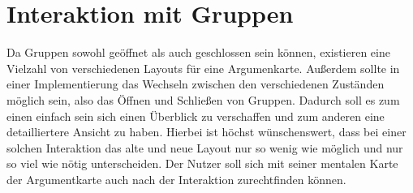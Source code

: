 
\section{Interaktion mit Gruppen}
Da Gruppen sowohl geöffnet als auch geschlossen sein können, existieren eine Vielzahl von verschiedenen Layouts für eine Argumenkarte.
Außerdem sollte in einer Implementierung das Wechseln zwischen den verschiedenen Zuständen möglich sein, also das Öffnen und Schließen von Gruppen. 
Dadurch soll es zum einen einfach sein sich einen Überblick zu verschaffen und zum anderen eine detailliertere Ansicht zu haben.
Hierbei ist höchst wünschenswert, dass bei einer solchen Interaktion das alte und neue Layout nur so wenig wie möglich und nur so viel wie nötig unterscheiden. 
Der Nutzer soll sich mit seiner mentalen Karte der Argumentkarte auch nach der Interaktion zurechtfinden können.

